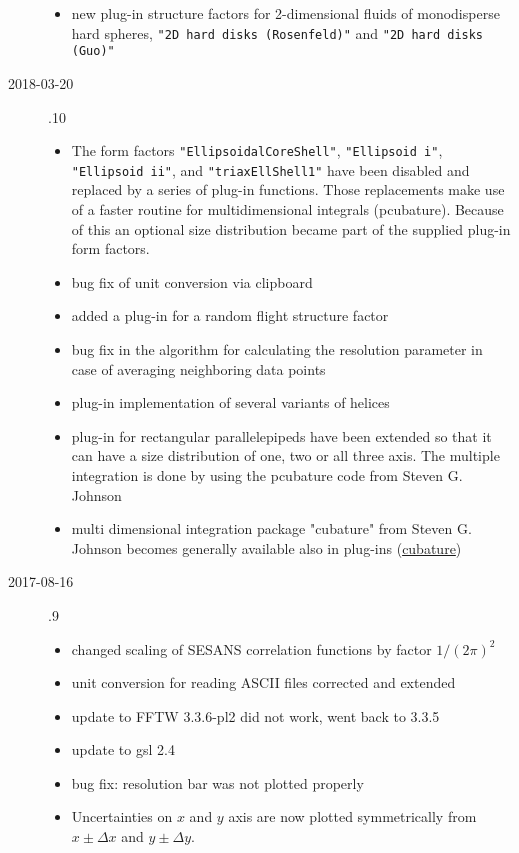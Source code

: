 \begin{description}
\begin{itemize}
    \item new plug-in structure factors for 2-dimensional fluids of monodisperse hard spheres, \texttt{"2D hard disks (Rosenfeld)"} and \texttt{"2D hard disks (Guo)"}
    \end{itemize}
\item[2018-03-20] .10
    \begin{itemize}
    \item The form factors \texttt{"EllipsoidalCoreShell"}, \texttt{"Ellipsoid i"}, \texttt{"Ellipsoid ii"}, and \texttt{"triaxEllShell1"} have been disabled and replaced by a series of plug-in functions. Those replacements make use of a faster routine for multidimensional integrals (pcubature). Because of this an optional size distribution became part of the supplied plug-in form factors.
    \item bug fix of unit conversion via clipboard
    \item added a plug-in for a random flight structure factor
    \item bug fix in the algorithm for calculating the resolution parameter in case of averaging neighboring data points
    \item  plug-in implementation of several variants of helices
    \item plug-in for rectangular parallelepipeds have been extended so that it can have a size distribution of one, two or all three axis. The multiple integration is done by using the pcubature code from  Steven G. Johnson
    \item multi dimensional integration package "cubature" from  Steven G. Johnson becomes generally available also in plug-ins (\href{https://github.com/stevengj/cubature}{cubature})
    \end{itemize}
\item[2017-08-16] .9
    \begin{itemize}
    \item changed scaling of SESANS correlation functions by factor $1/(2\pi)^2$
    \item unit conversion for reading ASCII files corrected and extended
    \item update to FFTW 3.3.6-pl2 did not work, went back to 3.3.5
    \item update to gsl 2.4
    \item bug fix: resolution bar was not plotted properly
    \item Uncertainties on $x$ and $y$ axis are now plotted symmetrically from $x\pm\Delta x$ and $y\pm\Delta y$.

\end{itemize}
\end{description}
